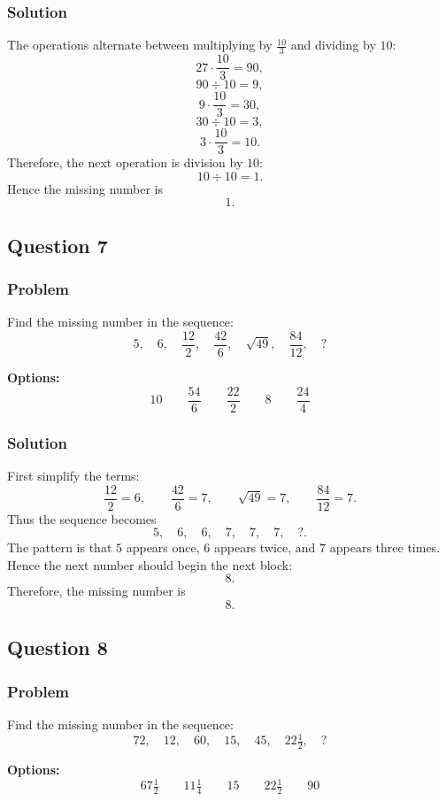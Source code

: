 \documentclass[12pt]{article}
\begin{document}
\subsubsection{Solution}
The operations alternate between multiplying by \(\frac{10}{3}\) and dividing by \(10\):
\[
27\cdot \frac{10}{3}=90,
\]
\[
90\div 10=9,
\]
\[
9\cdot \frac{10}{3}=30,
\]
\[
30\div 10=3,
\]
\[
3\cdot \frac{10}{3}=10.
\]
Therefore, the next operation is division by \(10\):
\[
10\div 10=1.
\]
Hence the missing number is
\[
\boxed{1}.
\]

\subsection{Question 7}
\subsubsection{Problem}
Find the missing number in the sequence:
\[
5,\quad 6,\quad \frac{12}{2},\quad \frac{42}{6},\quad \sqrt{49},\quad \frac{84}{12},\quad ?
\]

\noindent\textbf{Options:}
\[
\boxed{10}
\qquad
\boxed{\frac{54}{6}}
\qquad
\boxed{\frac{22}{2}}
\qquad
\boxed{8}
\qquad
\boxed{\frac{24}{4}}
\]

\subsubsection{Solution}
First simplify the terms:
\[
\frac{12}{2}=6,\qquad \frac{42}{6}=7,\qquad \sqrt{49}=7,\qquad \frac{84}{12}=7.
\]
Thus the sequence becomes
\[
5,\quad 6,\quad 6,\quad 7,\quad 7,\quad 7,\quad ?.
\]
The pattern is that \(5\) appears once, \(6\) appears twice, and \(7\) appears three times. Hence the next number should begin the next block:
\[
8.
\]
Therefore, the missing number is
\[
\boxed{8}.
\]

\subsection{Question 8}
\subsubsection{Problem}
Find the missing number in the sequence:
\[
72,\quad 12,\quad 60,\quad 15,\quad 45,\quad 22\tfrac{1}{2},\quad ?
\]

\noindent\textbf{Options:}
\[
\boxed{67\tfrac{1}{2}}
\qquad
\boxed{11\tfrac{1}{4}}
\qquad
\boxed{15}
\qquad
\boxed{22\tfrac{1}{2}}
\qquad
\boxed{90}
\]
\end{document}
